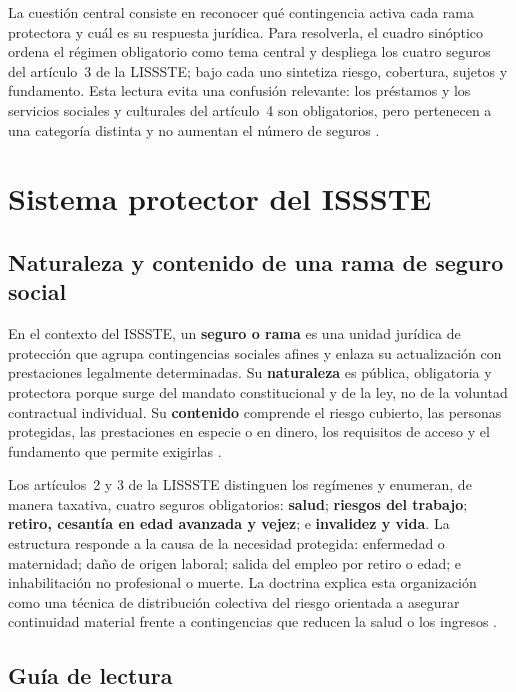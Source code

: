 \documentclass[12pt,letterpaper,oneside]{article}
\begin{document}
La cuesti\'on central consiste en reconocer qu\'e contingencia activa cada rama protectora y cu\'al es su respuesta jur\'idica. Para resolverla, el cuadro sin\'optico ordena el r\'egimen obligatorio como tema central y despliega los cuatro seguros del art\'iculo~3 de la LISSSTE; bajo cada uno sintetiza riesgo, cobertura, sujetos y fundamento. Esta lectura evita una confusi\'on relevante: los pr\'estamos y los servicios sociales y culturales del art\'iculo~4 son obligatorios, pero pertenecen a una categor\'ia distinta y no aumentan el n\'umero de seguros \citep{lissste2026}.

\section{Sistema protector del ISSSTE}

\subsection{Naturaleza y contenido de una rama de seguro social}

En el contexto del ISSSTE, un \textbf{seguro o rama} es una unidad jur\'idica de protecci\'on que agrupa contingencias sociales afines y enlaza su actualizaci\'on con prestaciones legalmente determinadas. Su \textbf{naturaleza} es p\'ublica, obligatoria y protectora porque surge del mandato constitucional y de la ley, no de la voluntad contractual individual. Su \textbf{contenido} comprende el riesgo cubierto, las personas protegidas, las prestaciones en especie o en dinero, los requisitos de acceso y el fundamento que permite exigirlas \citep{bricenoRuiz2011,ramirezChavero2009,lissste2026}.

Los art\'iculos~2 y 3 de la LISSSTE distinguen los reg\'imenes y enumeran, de manera taxativa, cuatro seguros obligatorios: \textbf{salud}; \textbf{riesgos del trabajo}; \textbf{retiro, cesant\'ia en edad avanzada y vejez}; e \textbf{invalidez y vida}. La estructura responde a la causa de la necesidad protegida: enfermedad o maternidad; da\~no de origen laboral; salida del empleo por retiro o edad; e inhabilitaci\'on no profesional o muerte. La doctrina explica esta organizaci\'on como una t\'ecnica de distribuci\'on colectiva del riesgo orientada a asegurar continuidad material frente a contingencias que reducen la salud o los ingresos \citep{bricenoRuiz2011,ramirezChavero2009}.

\subsection{Gu\'ia de lectura}
\end{document}

